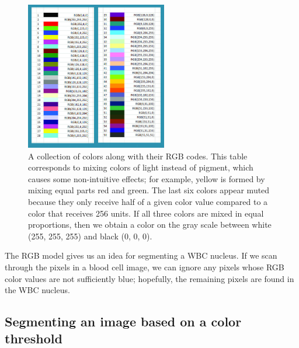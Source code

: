 \begin{figure}[h]
\centering
\mySfFamily
\includegraphics[width = 0.55\textwidth]{../images_CMYK/RGB_color_chart}
\caption{A collection of colors along with their RGB codes. This table corresponds to mixing colors of light instead of pigment, which causes some non-intuitive effects; for example, yellow is formed by mixing equal parts red and green. The last six colors appear muted because they only receive half of a given color value compared to a color that receives 256 units. If all three colors are mixed in equal proportions, then we obtain a color on the gray scale between white (255, 255, 255) and black (0, 0, 0).}
\label{fig:RGB_color_chart}
\end{figure}

The RGB model gives us an idea for segmenting a WBC nucleus. If we scan through the pixels in a blood cell image, we can ignore any pixels whose RGB color values are not sufficiently blue; hopefully, the remaining pixels are found in the WBC nucleus.\\

\begin{qbox}\end{qbox}

\FloatBarrier
{}
\subsection{Segmenting an image based on a color threshold}

